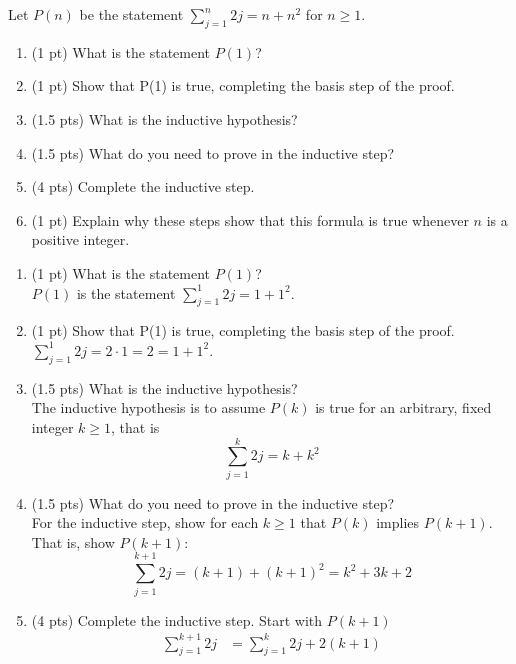 \begin{questions}

 Let $P(n)$ be the statement $\sum_{j=1}^n 2j = n + n^2$ for $n \geq 1$.
\begin{enumerate}[label=(\alph*),itemsep=0pt,parsep=0pt,
    topsep=0pt,partopsep=0pt]
  \item (1 pt) What is the statement $P(1)$? 
  \item (1 pt) Show that P(1) is true, completing the basis step of the proof.
  \item (1.5 pts) What is the inductive hypothesis? 
  \item (1.5 pts) What do you need to prove in the inductive step? 
  \item (4 pts) Complete the inductive step.
  \item (1 pt) Explain why these steps show that this formula is true whenever $n$ is a positive integer. 
\end{enumerate}
    \ifprintanswers
        \vspace{-10pt}
   \fi
\begin{solution}
\begin{enumerate}[label=(\alph*),itemsep=0pt,parsep=0pt,
    topsep=0pt,partopsep=0pt]
  \item (1 pt) What is the statement $P(1)$? \\
    $P(1)$ is the statement $\sum_{j=1}^1 2j = 1 + 1^2 $.
  \item (1 pt) Show that P(1) is true, completing the basis step of the proof. \\
    $\sum_{j=1}^1 2j = 2\cdot 1 = 2 = 1 + 1^2 $.
  \item (1.5 pts) What is the inductive hypothesis? \\
    The inductive hypothesis is to assume $P(k)$ is true for an arbitrary, fixed integer $k \geq 1$, that is
    \[ \sum_{j=1}^k 2j = k + k^2 \]
  \item (1.5 pts) What do you need to prove in the inductive step? \\
    For the inductive step, show for each $k \geq 1$ that $P(k)$ implies $P(k+1)$. \\
    That is, show $P(k+1)$:
    \[ \sum_{j=1}^{k+1} 2j = (k+1) + (k+1)^2  = k^2 + 3k + 2\]
  \item (4 pts) Complete the inductive step.
    Start with $P(k+1)$ 
      \begin{align*}
        \sum_{j=1}^{k+1} 2j &= \sum_{j=1}^k 2j + 2(k+1) \\

\end{align*}
\end{enumerate}
\end{solution}
\end{questions}
